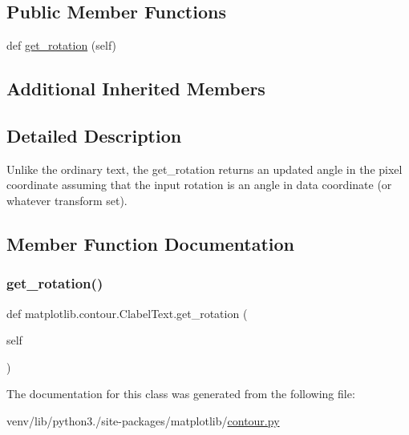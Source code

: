 \subsection*{Public Member Functions}
\begin{DoxyCompactItemize}
\item 
def \hyperlink{classmatplotlib_1_1contour_1_1ClabelText_af4578d01a1eabd5a91864b470e2b553b}{get\+\_\+rotation} (self)
\end{DoxyCompactItemize}
\subsection*{Additional Inherited Members}


\subsection{Detailed Description}
\begin{DoxyVerb}Unlike the ordinary text, the get_rotation returns an updated
angle in the pixel coordinate assuming that the input rotation is
an angle in data coordinate (or whatever transform set).
\end{DoxyVerb}
 

\subsection{Member Function Documentation}
\mbox{\label{classmatplotlib_1_1contour_1_1ClabelText_af4578d01a1eabd5a91864b470e2b553b}} 
\subsubsection{\texorpdfstring{get\+\_\+rotation()}{get\_rotation()}}
{\footnotesize\ttfamily def matplotlib.\+contour.\+Clabel\+Text.\+get\+\_\+rotation (\begin{DoxyParamCaption}\item[{}]{self }\end{DoxyParamCaption})}



The documentation for this class was generated from the following file\+:\begin{DoxyCompactItemize}
\item 
venv/lib/python3./site-\/packages/matplotlib/\hyperlink{contour_8py}{contour.\+py}\end{DoxyCompactItemize}
